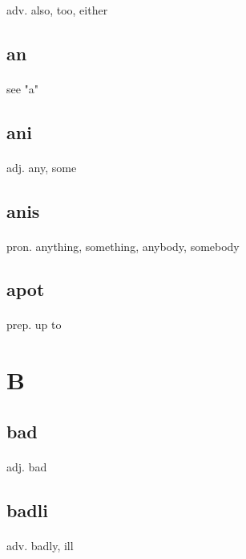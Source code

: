 \documentclass[UTF8]{article}
\begin{document}
    \paragraph{} adv. also, too, either 
    \subsection{an}
    \paragraph{} see "a" 
    \subsection{ani}
    \paragraph{} adj. any, some 
    \subsection{anis}
    \paragraph{} pron. anything, something, anybody, somebody
    \subsection{apot}
    \paragraph{} prep. up to
    \newpage \section{B}
    \subsection{bad}
    \paragraph{} adj. bad 
    \subsection{badli}
    \paragraph{} adv. badly, ill 
\end{document}
